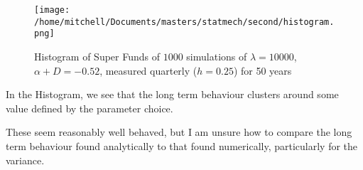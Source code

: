 \documentclass[11pt,a4paper]{article}
\begin{document}
\medskip
\begin{figure}[H]
  \centering
  \texttt{[image: /home/mitchell/Documents/masters/statmech/second/histogram.png]}
  \caption{Histogram of Super Funds of $1000$ simulations of $\lambda = 10000$, $ \alpha + D = -0.52 $, measured quarterly ($h = 0.25$) for 50 years}
  \label{fig:histogram}
\end{figure}
In the Histogram, we see that the long term behaviour clusters around some value defined by the parameter choice. 

These seem reasonably well behaved, but I am unsure how to compare the long term behaviour found analytically to that found numerically, particularly for the variance. 
\medskip 

\medskip
\end{document}
